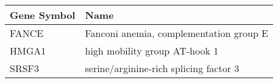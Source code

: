 \begin{tabular}{ll}
\toprule
Gene Symbol &                                    Name \\
\midrule
      FANCE & Fanconi anemia, complementation group E \\
      HMGA1 &           high mobility group AT-hook 1 \\
      SRSF3 &  serine/arginine-rich splicing factor 3 \\
\bottomrule
\end{tabular}

